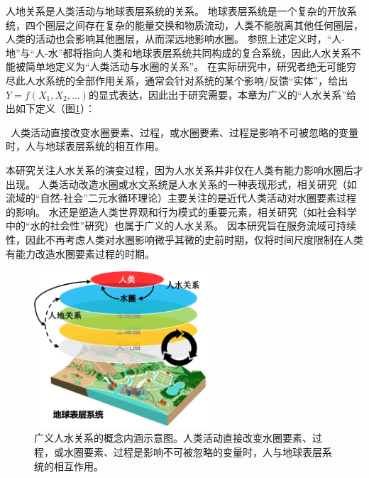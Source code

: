 人地关系是人类活动与地球表层系统的关系\cite{wu1991,li2016d}。
地球表层系统是一个复杂的开放系统，四个圈层之间存在复杂的能量交换和物质流动，人类不能脱离其他任何圈层，人类的活动也会影响其他圈层，从而深远地影响水圈。
参照上述定义时，“人-地”与“人-水”都将指向人类和地球表层系统共同构成的复合系统，因此人水关系不能被简单地定义为“人类活动与水圈的关系”。
在实际研究中，研究者绝无可能穷尽此人水系统的全部作用关系，通常会针对系统的某个影响/反馈“实体”，给出$Y = f(X_1, X_2, \dots)$的显式表达，因此出于研究需要，本章为广义的“人水关系”给出如下定义（图\ref{ch2:fig:definitions}）：

{\kai~人类活动直接改变水圈要素、过程，或水圈要素、过程是影响不可被忽略的变量时，人与地球表层系统的相互作用。}

本研究关注人水关系的演变过程，因为人水关系并非仅在人类有能力影响水圈后才出现。
人类活动改造水圈或水文系统是人水关系的一种表现形式，相关研究（如流域的“自然-社会”二元水循环理论）主要关注的是近代人类活动对水圈要素过程的影响\cite{wang2006, wang2016}。
水还是塑造人类世界观和行为模式的重要元素，相关研究（如社会科学中的“水的社会性”研究）也属于广义的人水关系。
因本研究旨在服务流域可持续性，因此不再考虑人类对水圈影响微乎其微的史前时期，仅将时间尺度限制在人类有能力改造水圈要素过程的时期。

\begin{figure}[!htb]
    \centering
    \includegraphics[width=0.6\textwidth]{img/ch2/ch2_scope.png}
    \caption[广义人水关系的概念内涵示意图]{广义人水关系的概念内涵示意图。人类活动直接改变水圈要素、过程，或水圈要素、过程是影响不可被忽略的变量时，人与地球表层系统的相互作用。}\label{ch2:fig:definitions}
\end{figure}


